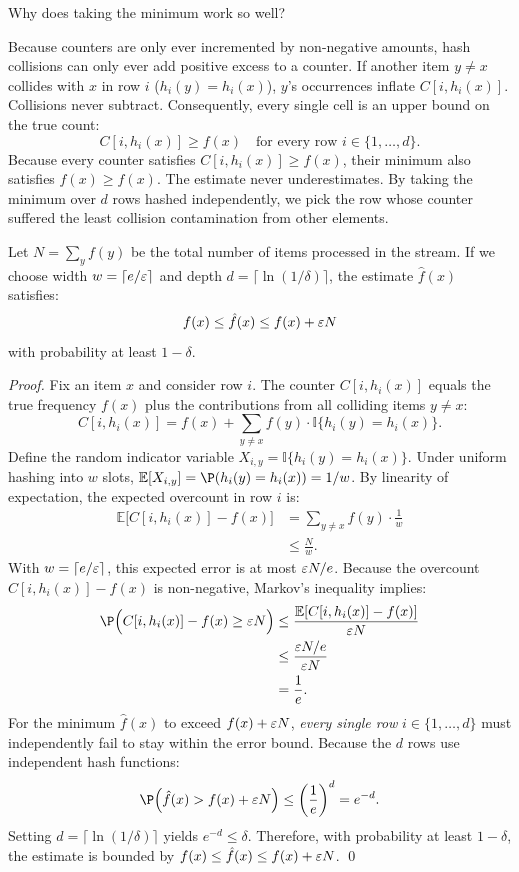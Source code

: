 Why does taking the minimum work so well?

Because counters are only ever incremented by non-negative amounts, hash collisions can only ever add positive excess to a counter. If another item $y \neq x$ collides with $x$ in row $i$ ($h_i(y) = h_i(x)$), $y$'s occurrences inflate $C[i, h_i(x)]$. Collisions never subtract. Consequently, every single cell is an upper bound on the true count:
\[
  C[i, h_i(x)] \ge f(x) \quad \text{for every row } i \in \{1, \dots, d\}.
\]
Because every counter satisfies $C[i, h_i(x)] \ge f(x)$, their minimum also satisfies $\hat{f}(x) \ge f(x)$. The estimate never underestimates. By taking the minimum over $d$ rows hashed independently, we pick the row whose counter suffered the least collision contamination from other elements.

\begin{theorem}
Let $N = \sum_{y} f(y)$ be the total number of items processed in the stream. If we choose width $w = \lceil e / \varepsilon \rceil$ and depth $d = \lceil \ln(1 / \delta) \rceil$, the estimate $\hat{f}(x)$ satisfies:
\[
  f(x) \le \hat{f}(x) \le f(x) + \varepsilon N
\]
with probability at least $1 - \delta$.
\end{theorem}

\begin{proof}
Fix an item $x$ and consider row $i$. The counter $C[i, h_i(x)]$ equals the true frequency $f(x)$ plus the contributions from all colliding items $y \neq x$:
\[
  C[i, h_i(x)] = f(x) + \sum_{y \neq x} f(y) \cdot \mathbb{I}\{h_i(y) = h_i(x)\}.
\]
Define the random indicator variable $X_{i, y} = \mathbb{I}\{h_i(y) = h_i(x)\}$. Under uniform hashing into $w$ slots, $\mathbb{E}[X_{i, y}] = \P(h_i(y) = h_i(x)) = 1/w$. By linearity of expectation, the expected overcount in row $i$ is:
\begin{align*}
  \mathbb{E}\big[C[i, h_i(x)] - f(x)\big] &= \sum_{y \neq x} f(y) \cdot \frac{1}{w} \\
  &\le \frac{N}{w}.
\end{align*}
With $w = \lceil e / \varepsilon \rceil$, this expected error is at most $\varepsilon N / e$. Because the overcount $C[i, h_i(x)] - f(x)$ is non-negative, Markov's inequality implies:
\begin{align*}
  \P\Big(C[i, h_i(x)] - f(x) \ge \eps N\Big) &\le \frac{\mathbb{E}[C[i, h_i(x)] - f(x)]}{\eps N} \\
  &\le \frac{\eps N / e}{\eps N} \\
  &= \frac{1}{e}.
\end{align*}
For the minimum $\hat{f}(x)$ to exceed $f(x) + \varepsilon N$, \emph{every single row} $i \in \{1, \dots, d\}$ must independently fail to stay within the error bound. Because the $d$ rows use independent hash functions:
\[
  \P\Big(\hat{f}(x) > f(x) + \eps N\Big) \le \left(\frac{1}{e}\right)^d = e^{-d}.
\]
Setting $d = \lceil \ln(1 / \delta) \rceil$ yields $e^{-d} \le \delta$. Therefore, with probability at least $1 - \delta$, the estimate is bounded by $f(x) \le \hat{f}(x) \le f(x) + \varepsilon N$. \qed
\end{proof}

